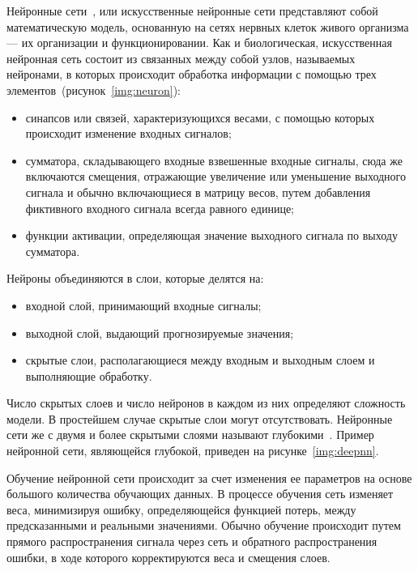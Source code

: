 Нейронные сети~\cite{nndef}, или искусственные нейронные сети представляют собой
математическую модель, основанную на сетях нервных клеток живого организма — их
организации и функционировании. Как и биологическая, искусственная нейронная
сеть состоит из связанных между собой узлов, называемых нейронами, в которых
происходит обработка информации с помощью трех
элементов~(рисунок~\ref{img:neuron}):

\begin{itemize}
    \item синапсов или связей, характеризующихся весами, с помощью которых
        происходит изменение входных сигналов;
    \item сумматора, складывающего входные взвешенные входные сигналы, сюда же
        включаются смещения, отражающие увеличение или уменьшение выходного
        сигнала и обычно включающиеся в матрицу весов, путем добавления
        фиктивного входного сигнала всегда равного единице;
    \item функции активации, определяющая значение выходного сигнала по выходу
        сумматора.
\end{itemize}


Нейроны объединяются в слои, которые делятся на:
\begin{itemize}
    \item входной слой, принимающий входные сигналы;
    \item выходной слой, выдающий прогнозируемые значения;
    \item скрытые слои, располагающиеся между входным и выходным слоем и
        выполняющие обработку.
\end{itemize}

Число скрытых слоев и число нейронов в каждом из них определяют сложность
модели. В простейшем случае скрытые слои могут отсутствовать. Нейронные сети же
с двумя и более скрытыми слоями называют глубокими~\cite{deeplearning}. Пример
нейронной сети, являющейся глубокой, приведен на рисунке~\ref{img:deepnn}.


Обучение нейронной сети происходит за счет изменения ее параметров на основе
большого количества обучающих данных. В процессе обучения сеть изменяет веса,
минимизируя ошибку, определяющейся функцией потерь, между предсказанными и
реальными значениями. Обычно обучение происходит путем прямого распространения
сигнала через сеть и обратного распространения ошибки, в ходе которого
корректируются веса и смещения слоев.

